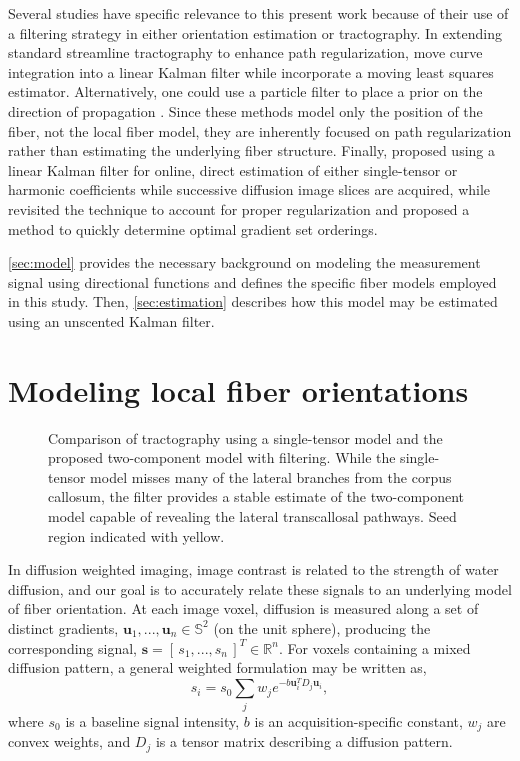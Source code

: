 \documentclass[final,hyperref]{gatech-thesis}
\renewcommand{\v}[1]{\ensuremath{\mathbf #1}\xspace}
\newcommand{\rv}[1]{\ensuremath{[\, #1 \,]}\xspace} %
\newcommand{\R}{\ensuremath{\mathbb R}}
\renewcommand{\S}{\ensuremath{\mathbb S}}
\newcommand{\s}{\v s}
\renewcommand{\u}{\v u}
\begin{document}
Several studies have specific relevance to this present work because of their
use of a filtering strategy in either orientation estimation or tractography.
%
In extending standard streamline tractography to enhance path regularization,
\cite{Gossl2002} move curve integration into a linear Kalman filter while
\cite{Zhukov2002} incorporate a moving least squares estimator.
%
Alternatively, one could use a particle filter to place a prior on the
direction of propagation \cite{Zhang2009}.
%
Since these methods model only the position of the fiber, not the local fiber
model, they are inherently focused on path regularization rather than
estimating the underlying fiber structure.
%
Finally, \cite{Poupon2008} proposed using a linear Kalman filter for online,
direct estimation of either single-tensor or harmonic coefficients while
successive diffusion image slices are acquired, while \cite{Deriche2009}
revisited the technique to account for proper regularization and proposed a
method to quickly determine optimal gradient set orderings.

\autoref{sec:model} provides the necessary background on modeling the
measurement signal using directional functions and defines the specific fiber
models employed in this study.  Then, \autoref{sec:estimation} describes how
this model may be estimated using an unscented Kalman filter.



\section{Modeling local fiber orientations} \label{sec:model}

\begin{figure}[t]
  \centering
  \caption{Comparison of tractography using a single-tensor model and the
    proposed two-component model with filtering.  While the single-tensor
    model misses many of the lateral branches from the corpus callosum, the
    filter provides a stable estimate of the two-component model capable of
    revealing the lateral transcallosal pathways.  Seed region indicated with
    yellow.}
  \label{fig:sweetness}
\end{figure}
In diffusion weighted imaging, image contrast is related to the strength of
water diffusion, and our goal is to accurately relate these signals to an
underlying model of fiber orientation.  At each image voxel, diffusion is
measured along a set of distinct gradients, $\u_1,...,\u_n\in\S^2$ (on the
unit sphere), producing the corresponding signal,
$\s=\rv{s_1,...,s_n}^T\in\R^n$.  For voxels containing a mixed diffusion
pattern, a general weighted formulation may be written as,
\begin{equation}
  s_i = s_0 \sum_j w_j e^{ -b \u_i^T D_j \u_i },
\end{equation}
where $s_0$ is a baseline signal intensity, $b$ is an acquisition-specific
constant, $w_j$ are convex weights, and $D_j$ is a tensor matrix describing a
diffusion pattern.
\end{document}
